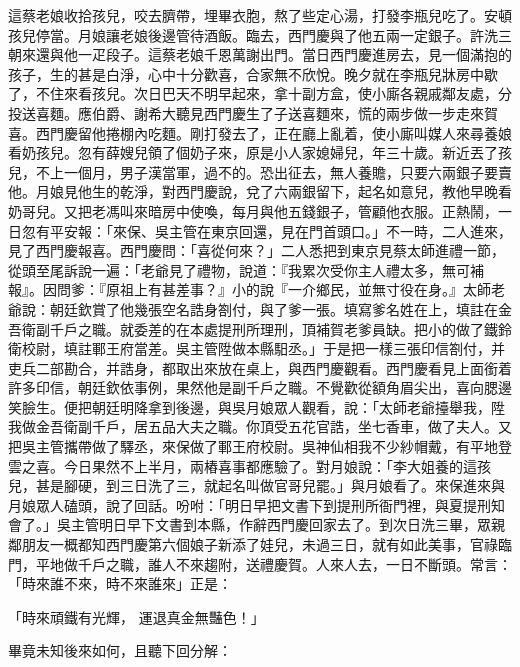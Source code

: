 \begin{showcontents}{}
這蔡老娘收拾孩兒，咬去臍帶，埋畢衣胞，熬了些定心湯，打發李瓶兒吃了。安頓孩兒停當。月娘讓老娘後邊管待酒飯。臨去，西門慶與了他五兩一定銀子。許洗三朝來還與他一疋段子。這蔡老娘千恩萬謝出門。當日西門慶進房去，見一個滿抱的孩子，生的甚是白淨，心中十分歡喜，合家無不欣悅。晚夕就在李瓶兒牀房中歇了，不住來看孩兒。次日巴天不明早起來，拿十副方盒，使小廝各親戚鄰友處，分投送喜麵。應伯爵、謝希大聽見西門慶生了子送喜麵來，慌的兩步做一步走來賀喜。西門慶留他捲棚內吃麵。剛打發去了，正在廳上亂着，使小廝叫媒人來尋養娘看奶孩兒。忽有薛嫂兒領了個奶子來，原是小人家媳婦兒，年三十歲。新近丟了孩兒，不上一個月，男子漢當軍，過不的。恐出征去，無人養贍，只要六兩銀子要賣他。月娘見他生的乾淨，對西門慶說，兌了六兩銀留下，起名如意兒，教他早晚看奶哥兒。又把老馮叫來暗房中使喚，每月與他五錢銀子，管顧他衣服。正熱鬧，一日忽有平安報：「來保、吳主管在東京回還，見在門首頭口。」不一時，二人進來，見了西門慶報喜。西門慶問：「喜從何來？」二人悉把到東京見蔡太師進禮一節，從頭至尾訴說一遍：「老爺見了禮物，說道：『我累次受你主人禮太多，無可補報』。因問爹：『原祖上有甚差事？』小的說『一介鄉民，並無寸役在身。』太師老爺說：朝廷欽賞了他幾張空名誥身劄付，與了爹一張。填寫爹名姓在上，填註在金吾衛副千戶之職。就委差的在本處提刑所理刑，頂補賀老爹員缺。把小的做了鐵鈴衛校尉，填註鄆王府當差。吳主管陞做本縣馹丞。」于是把一樣三張印信劄付，并吏兵二部勘合，并誥身，都取出來放在桌上，與西門慶觀看。西門慶看見上面銜着許多印信，朝廷欽依事例，果然他是副千戶之職。不覺歡從額角眉尖出，喜向腮邊笑臉生。便把朝廷明降拿到後邊，與吳月娘眾人觀看，說：「太師老爺擡舉我，陞我做金吾衛副千戶，居五品大夫之職。你頂受五花官誥，坐七香車，做了夫人。又把吳主管攜帶做了驛丞，來保做了鄆王府校尉。吳神仙相我不少紗帽戴，有平地登雲之喜。今日果然不上半月，兩樁喜事都應驗了。對月娘說：「李大姐養的這孩兒，甚是腳硬，到三日洗了三，就起名叫做官哥兒罷。」與月娘看了。來保進來與月娘眾人磕頭，說了回話。吩咐：「明日早把文書下到提刑所衙門裡，與夏提刑知會了。」吳主管明日早下文書到本縣，作辭西門慶回家去了。到次日洗三畢，眾親鄰朋友一概都知西門慶第六個娘子新添了娃兒，未過三日，就有如此美事，官祿臨門，平地做千戶之職，誰人不來趨附，送禮慶賀。人來人去，一日不斷頭。常言：「時來誰不來，時不來誰來」正是：

「時來頑鐵有光輝，  運退真金無豔色！」

畢竟未知後來如何，且聽下回分解：






\end{showcontents}


